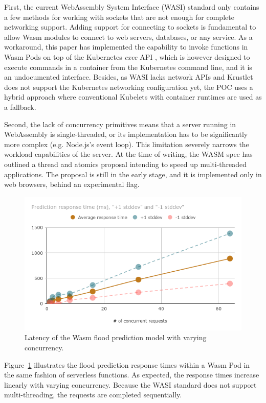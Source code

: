 First, the current WebAssembly System Interface (WASI) standard only contains a few methods for working with sockets that are not enough for complete networking support. Adding support for connecting to sockets is fundamental to allow Wasm modules to connect to web servers, databases, or any service. As a workaround, this paper has implemented the capability to invoke functions in Wasm Pods on top of the Kubernetes \emph{exec} API \cite{k8s-exec}, which is however designed to execute commands in a container from the Kubernetes command line, and it is an undocumented interface. Besides, as WASI lacks network APIs and Krustlet does not support the Kubernetes networking configuration yet, the POC uses a hybrid approach where conventional Kubelets with container runtimes are used as a fallback.

Second, the lack of concurrency primitives means that a server running in WebAssembly is single-threaded, or its implementation has to be significantly more complex (e.g. Node.js's event loop). This limitation severely narrows the workload capabilities of the server. At the time of writing, the WASM spec has outlined a thread and atomics proposal intending to speed up multi-threaded applications. The proposal is still in the early stage, and it is implemented only in web browsers, behind an experimental flag.

\begin{figure}[ht]
\centering
\includegraphics[width=\columnwidth]{figures/b-krustlet-4}
\caption{Latency of the Wasm flood prediction model with varying concurrency.} \label{fig:b-krustlet-4}
\end{figure}

Figure~\ref{fig:b-krustlet-4} illustrates the flood prediction response times within a Wasm Pod in the same fashion of serverless functions. As expected, the response times increase linearly with varying concurrency. Because the WASI standard does not support multi-threading, the requests are completed sequentially.

